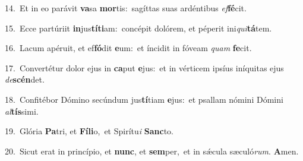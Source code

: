 {\numbfont\textcolor{\numbcolor}{14.}}~Et in eo parávit \textbf{va}\-sa \textbf{mor}\-tis:~\star sagíttas suas ardéntibus \textit{ef}\-\textbf{fé}cit.\par
{\numbfont\textcolor{\numbcolor}{15.}}~Ecce partúriit \textbf{in}\-jus\-\textbf{tí}\-\textbf{ti}am:~\star concépit dolórem, et péperit ini\-\textit{qui}\-\textbf{tá}tem.\par
{\numbfont\textcolor{\numbcolor}{16.}}~Lacum apéruit, et ef\-\textbf{fó}\-dit \textbf{e}\-um:~\star et íncidit in fóveam \textit{quam} \textbf{fe}\-cit.\par
{\numbfont\textcolor{\numbcolor}{17.}}~Convertétur dolor ejus in \textbf{ca}\-put \textbf{e}\-jus:~\star et in vérticem ipsíus iníquitas ejus \textit{de}\-\textbf{scén}det.\par
{\numbfont\textcolor{\numbcolor}{18.}}~Confitébor Dómino secúndum jus\-\textbf{tí}\-tiam \textbf{e}\-jus:~\star et psallam nómini Dómini \textit{al}\-\textbf{tís}simi.\par
{\numbfont\textcolor{\numbcolor}{19.}}~Glória \textbf{Pa}\-tri, et \textbf{Fí}\-\textbf{li}o,~\star et Spirítu\textit{i} \textbf{Sanc}\-to.\par
{\numbfont\textcolor{\numbcolor}{20.}}~Sicut erat in princípio, et \textbf{nunc}\-, et \textbf{sem}\-per,~\star et in sǽcula sæculó\-\textit{rum}\-. \textbf{A}\-men.\par
